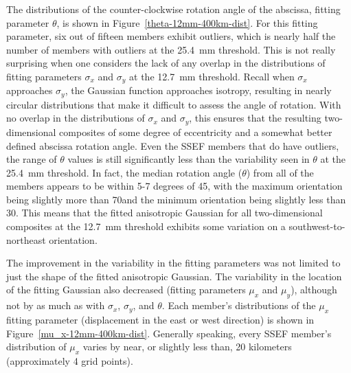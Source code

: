 The distributions of the counter-clockwise rotation angle of the abscissa, fitting parameter $\theta$, is shown in \mbox{Figure \ref{theta-12mm-400km-dist}}.
For this fitting parameter, six out of fifteen members exhibit outliers, which is nearly half the number of members with outliers at the \mbox{25.4 mm} threshold.
This is not really surprising when one considers the lack of any overlap in the distributions of fitting parameters $\sigma_x$ and $\sigma_y$ at the \mbox{12.7 mm} threshold.
Recall when $\sigma_x$ approaches $\sigma_y$, the Gaussian function approaches isotropy, resulting in nearly circular distributions that make it difficult to assess the angle of rotation.
With no overlap in the distributions of $\sigma_x$ and $\sigma_y$, this ensures that the resulting two-dimensional composites of some degree of eccentricity and a somewhat better defined abscissa rotation angle.
Even the SSEF members that do have outliers, the range of $\theta$ values is still significantly less than the variability seen in $\theta$ at the \mbox{25.4 mm} threshold.
In fact, the median rotation angle ($\theta$) from all of the members appears to be within 5-7 degrees of 45\degree, with the maximum orientation being slightly more than 70\degree and the minimum orientation being slightly less than 30\degree.
This means that the fitted anisotropic Gaussian for all two-dimensional composites at the \mbox{12.7 mm} threshold exhibits some variation on a southwest-to-northeast orientation.


The improvement in the variability in the fitting parameters was not limited to just the shape of the fitted anisotropic Gaussian.
The variability in the location of the fitting Gaussian also decreased (fitting parameters $\mu_x$ and $\mu_y$), although not by as much as with $\sigma_x$, $\sigma_y$, and $\theta$.
Each member's distributions of the $\mu_x$ fitting parameter (displacement in the east or west direction) is shown in \mbox{Figure \ref{mu_x-12mm-400km-dist}}.
Generally speaking, every SSEF member's distribution of $\mu_x$ varies by near, or slightly less than, 20 kilometers (approximately 4 grid points).


